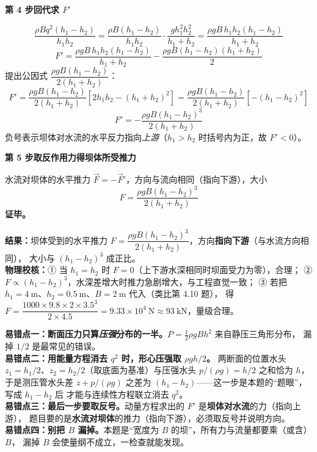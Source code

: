 \begin{jie}
\textbf{第 4 步\quad 回代求 $F'$}

\[ \frac{\rho Bq^2(h_1-h_2)}{h_1h_2}
   =\frac{\rho B(h_1-h_2)}{h_1h_2}\cdot\frac{g h_1^2h_2^2}{h_1+h_2}
   =\frac{\rho gB\,h_1h_2(h_1-h_2)}{h_1+h_2} \]
\[ F'=\frac{\rho gB\,h_1h_2(h_1-h_2)}{h_1+h_2}-\frac{\rho gB(h_1-h_2)(h_1+h_2)}{2} \]
提出公因式 $\dfrac{\rho gB(h_1-h_2)}{2(h_1+h_2)}$：
\[ F'=\frac{\rho gB(h_1-h_2)}{2(h_1+h_2)}\left[2h_1h_2-(h_1+h_2)^2\right]
   =\frac{\rho gB(h_1-h_2)}{2(h_1+h_2)}\left[-\left(h_1-h_2\right)^2\right] \]
\[ F'=-\frac{\rho gB(h_1-h_2)^3}{2(h_1+h_2)} \]
负号表示坝体对水流的水平反力指向\emph{上游}（$h_1>h_2$ 时括号内为正，故 $F'<0$）。

\textbf{第 5 步\quad 取反作用力得坝体所受推力}

水流对坝体的水平推力 $\vec F=-\vec F'$，方向与流向相同（指向下游），大小
\[ F=\frac{\rho gB(h_1-h_2)^3}{2(h_1+h_2)} \]
\textbf{证毕。}

\textbf{结果：}坝体受到的水平推力 $F=\dfrac{\rho gB(h_1-h_2)^3}{2(h_1+h_2)}$，方向\textbf{指向下游}（与水流方向相同），
大小与 $(h_1-h_2)^3$ 成正比。\\
\textbf{物理校核：}① 当 $h_1=h_2$ 时 $F=0$（上下游水深相同时坝面受力为零），合理；
② $F\propto(h_1-h_2)^3$，水深差增大时推力急剧增大，与工程直觉一致；
③ 若把 $h_1=4\ \mathrm{m}$、$h_2=0.5\ \mathrm{m}$、$B=2\ \mathrm{m}$ 代入（类比第 4.10 题），
得 $F=\dfrac{1000\times9.8\times2\times3.5^3}{2\times4.5}=9.33\times10^4\ \mathrm{N}\approx93\ \mathrm{kN}$，量级合理。
\end{jie}

\begin{yicuo}
\textbf{易错点一：断面压力只算\emph{压强}分布的一半。}$P=\frac{1}{2}\rho gBh^2$ 来自静压三角形分布，
漏掉 $1/2$ 是最常见的错误。\\
\textbf{易错点二：用能量方程消去 $q^2$ 时，形心压强取 $\rho g h/2$。}
两断面的位置水头 $z_1=h_1/2$、$z_2=h_2/2$（取底面为基准）与压强水头 $p/(\rho g)=h/2$ 之和恰为 $h$，
于是测压管水头差 $z+p/(\rho g)$ 之差为 $(h_1-h_2)$——这一步是本题的“题眼”，写成 $h_1-h_2$ 后
才能与连续性方程联立消去 $q^2$。\\
\textbf{易错点三：最后一步要取反号。}动量方程求出的 $F'$ 是\textbf{坝体对水流}的力（指向上游），
题目要的是\textbf{水流对坝体}的推力（指向下游），必须取反号并说明方向。\\
\textbf{易错点四：别把 $B$ 漏掉。}本题是“宽度为 $B$ 的坝”，所有力与流量都要乘（或含）$B$，
漏掉 $B$ 会使量纲不成立，一检查就能发现。
\end{yicuo}

